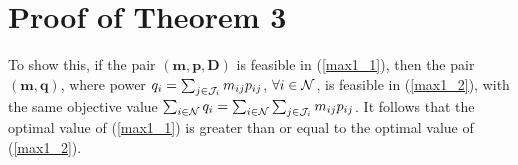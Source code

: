 \documentclass[journal]{IEEEtran}
\begin{document}
%


\section{Proof of Theorem 3}
To show this, if the pair $(\pmb{m},\pmb{p},\pmb{D})$ is feasible in (\ref{max1_1}), then the pair
$(\pmb{m}, \pmb{q})$, where power $q_i=\sum_{j \in {\cal{J}}_i }m_{ij} p_{ij}$, $\forall i \in \cal{N} $,
is feasible in (\ref{max1_2}),
with the same objective value $\sum_{i \in {\cal{N}}} q_{i}=\sum_{i \in {\cal{N}}}\sum_{j \in {\cal{J}}_i }m_{ij} p_{ij}$.
It follows that the optimal value of (\ref{max1_1}) is greater than or equal to the optimal value of (\ref{max1_2}).
\end{document}
